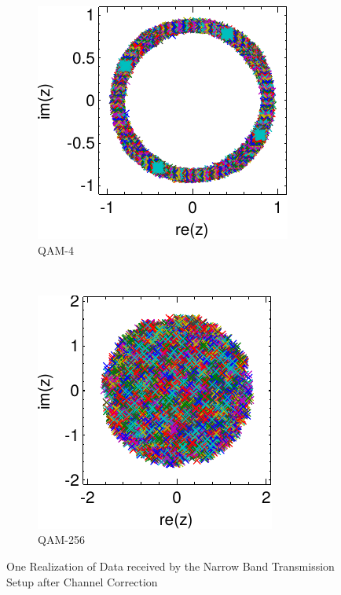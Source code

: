 \begin{figure}[p]
  \centering
  \begin{subfigure}{0.45\textwidth}
    \centering
    \includegraphics[width=\textwidth]{figures/matlab/res_450_qam4_cp_corr}
    \caption{\gls{QAM}-4}
    \label{fig:res_450_qam4_cp_corr}
  \end{subfigure}
  ~
  \begin{subfigure}{0.45\textwidth}
    \centering
    \includegraphics[width=\textwidth]{figures/matlab/res_450_qam256_cp_corr}
    \caption{\gls{QAM}-256}
    \label{fig:res_450_qam256_cp_corr}
  \end{subfigure}
  \caption{One Realization of Data received by the Narrow Band
    Transmission Setup after Channel Correction}
  \label{fig:res_450_cp_corr}
\end{figure}

